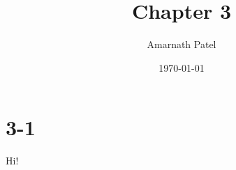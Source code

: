 
\usepackage{amsmath}
\usepackage{graphicx}
\usepackage{amssymb}

\title{Chapter 3}
\author{Amarnath Patel}
\date{\today}

\maketitle

\section{3-1}

Hi!


